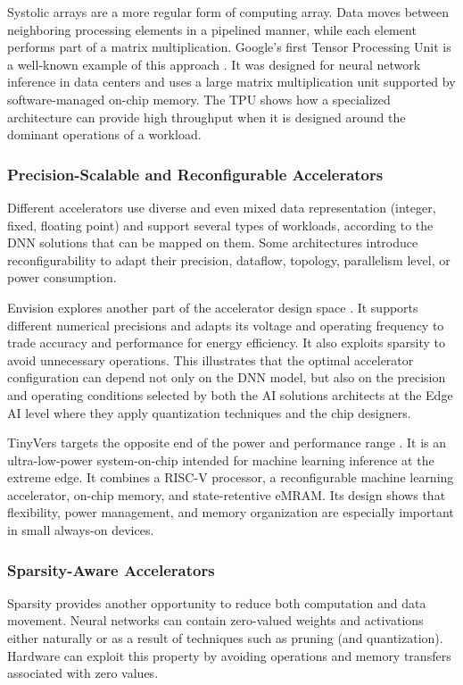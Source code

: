 Systolic arrays are a more regular form of computing array. Data moves
between neighboring processing elements in a pipelined manner, while
each element performs part of a matrix multiplication. Google's first
Tensor Processing Unit is a well-known example of this approach
\cite{tpuv1}. It was designed for neural network inference in data
centers and uses a large matrix multiplication unit supported by
software-managed on-chip memory. The TPU shows how a specialized
architecture can provide high throughput when it is designed around
the dominant operations of a workload.

\subsubsection{Precision-Scalable and Reconfigurable Accelerators}

Different accelerators use diverse and even mixed data representation (integer, fixed, floating point) and support several 
types of workloads, according to the DNN solutions that can be mapped on them. Some architectures introduce reconfigurability to
adapt their precision, dataflow, topology, parallelism level, or power consumption.

Envision explores another part of the accelerator design space
\cite{envision}. It supports different numerical precisions and adapts
its voltage and operating frequency to trade accuracy and performance
for energy efficiency. It also exploits sparsity to avoid unnecessary
operations. This illustrates that the optimal accelerator
configuration can depend not only on the DNN model, but also on the
precision and operating conditions selected by both the AI solutions architects at the Edge AI level where they apply quantization techniques and the chip designers.

TinyVers targets the opposite end of the power and performance range
\cite{tinyvers}. It is an ultra-low-power system-on-chip intended for
machine learning inference at the extreme edge. It combines a RISC-V
processor, a reconfigurable machine learning accelerator, on-chip
memory, and state-retentive eMRAM. Its design shows that flexibility,
power management, and memory organization are especially important in
small always-on devices.

\subsubsection{Sparsity-Aware Accelerators}

Sparsity provides another opportunity to reduce both computation and
data movement. Neural networks can contain zero-valued weights and
activations either naturally or as a result of techniques such as
pruning (and quantization). Hardware can exploit this property by
avoiding operations and memory transfers associated with zero values.

